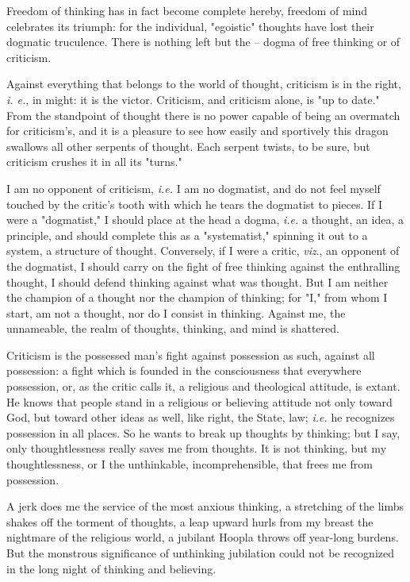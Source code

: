 Freedom of thinking has in fact become complete hereby, freedom of mind 
celebrates its triumph: for the individual, "{}egoistic"{} thoughts have lost 
their dogmatic truculence. There is nothing left but the -- dogma of free 
thinking or of criticism.

Against everything that belongs to the world of thought, criticism is in the 
right, \textit{i. e.}, in might: it is the victor. Criticism, and criticism 
alone, is "{}up to date."{} From the standpoint of thought there is no power 
capable of being an overmatch for criticism's, and it is a pleasure to see how 
easily and sportively this dragon swallows all other serpents of thought. Each 
serpent twists, to be sure, but criticism crushes it in all its "{}turns."{}

I am no opponent of criticism, \textit{i.e.} I am no dogmatist, and do not 
feel myself touched by the critic's tooth with which he tears the dogmatist to 
pieces. If I were a "{}dogmatist,"{} I should place at the head a dogma, 
\textit{i.e.} a thought, an idea, a principle, and should complete this as a 
"{}systematist,"{} spinning it out to a system, a structure of thought. 
Conversely, if I were a critic, \textit{viz}., an opponent of the dogmatist, I 
should carry on the fight of free thinking against the enthralling thought, I 
should defend thinking against what was thought. But I am neither the champion 
of a thought nor the champion of thinking; for "{}I,"{} from whom I start, am 
not a thought, nor do I consist in thinking. Against me, the unnameable, the 
realm of thoughts, thinking, and mind is shattered.

Criticism is the possessed man's fight against possession as such, against all 
possession: a fight which is founded in the consciousness that everywhere 
possession, or, as the critic calls it, a religious and theological attitude, 
is extant. He knows that people stand in a religious or believing attitude not 
only toward God, but toward other ideas as well, like right, the State, law; 
\textit{i.e.} he recognizes possession in all places. So he wants to break up 
thoughts by thinking; but I say, only thoughtlessness really saves me from 
thoughts. It is not thinking, but my thoughtlessness, or I the unthinkable, 
incomprehensible, that frees me from possession.

A jerk does me the service of the most anxious thinking, a stretching of the 
limbs shakes off the torment of thoughts, a leap upward hurls from my breast 
the nightmare of the religious world, a jubilant Hoopla throws off year-long 
burdens. But the monstrous significance of unthinking jubilation could not be 
recognized in the long night of thinking and believing.

